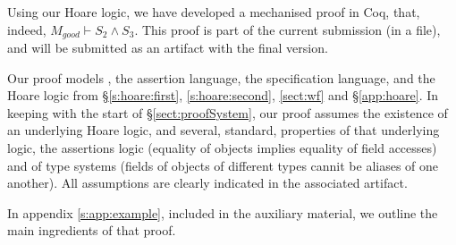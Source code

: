 Using our Hoare logic, we have developed a mechanised proof in Coq, that, indeed, $M_{good} \vdash S_2 \wedge S_3$.
This proof is part of the current submission (in a  file), and will be submitted as an artifact with the final version.

Our proof models  \LangOO, the assertion language, the specification language, and the Hoare logic from \S \ref{s:hoare:first},  \ref{s:hoare:second},  \ref{sect:wf} and \S \ref{app:hoare}.
In keeping with   the start of  \S \ref{sect:proofSystem}, our proof assumes the existence of an underlying Hoare logic,  
and several, standard, properties of that underlying logic, the assertions logic (\eg equality of objects implies equality of field accesses) and of type systems
(\eg  fields of objects of different types cannit be aliases of one another).
All assumptions  are clearly indicated in the associated artifact.

%

In appendix \ref{s:app:example}, included in the auxiliary material, we outline the main ingredients of that proof. 

